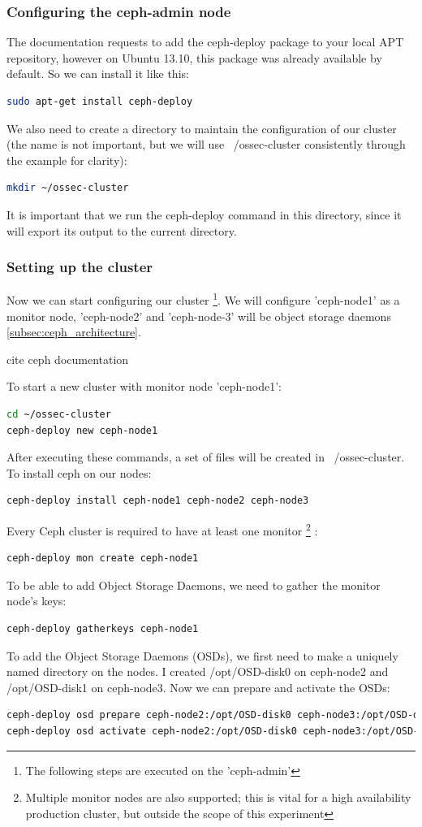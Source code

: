 \documentclass[12pt]{report}
\begin{document}
\subsubsection{Configuring the ceph-admin node}
The documentation requests to add the ceph-deploy package to your
local APT
repository, however on Ubuntu 13.10, this package was already
available by default.
So we can install it like this:
\begin{lstlisting}[language=bash]
sudo apt-get install ceph-deploy
\end{lstlisting}
We also need to create a directory to maintain the configuration of
our cluster (the name is not important, but we will use
~/ossec-cluster consistently through the example for clarity):
\begin{lstlisting}[language=bash]
mkdir ~/ossec-cluster
\end{lstlisting}
It is important that we run  the ceph-deploy command in this
directory, since it will export its output to the current directory.

\subsubsection{Setting up the cluster}
Now we can start configuring our cluster \footnote{The following steps are executed on the 'ceph-admin'}.
We will configure 'ceph-node1' as a monitor node, 'ceph-node2' and
'ceph-node-3' will be object storage daemons \ref{subsec:ceph_architecture}.

cite ceph documentation

To start a new cluster with monitor node 'ceph-node1':
\begin{lstlisting}[language=bash]
cd ~/ossec-cluster
ceph-deploy new ceph-node1
\end{lstlisting}
After executing these commands, a set of files will be created in
~/ossec-cluster.
To install ceph on our nodes:
\begin{lstlisting}[language=bash]
ceph-deploy install ceph-node1 ceph-node2 ceph-node3
\end{lstlisting}
Every Ceph cluster is required to have at least one monitor
\footnote{Multiple monitor nodes are also supported; this is vital for a high
  availability production cluster, but outside the scope of this experiment} :
\begin{lstlisting}[language=bash]
ceph-deploy mon create ceph-node1
\end{lstlisting}
To be able to add Object Storage Daemons, we need to gather the
monitor node's
keys:
\begin{lstlisting}[language=bash]
ceph-deploy gatherkeys ceph-node1
\end{lstlisting}
To add the Object Storage Daemons (OSDs), we first need to make a uniquely
named directory on the nodes. I created /opt/OSD-disk0 on ceph-node2 and
/opt/OSD-disk1 on ceph-node3. 
Now we can prepare and activate the OSDs:
\begin{lstlisting}[language=bash]
ceph-deploy osd prepare ceph-node2:/opt/OSD-disk0 ceph-node3:/opt/OSD-disk1
ceph-deploy osd activate ceph-node2:/opt/OSD-disk0 ceph-node3:/opt/OSD-disk1
\end{lstlisting}
\end{document}
